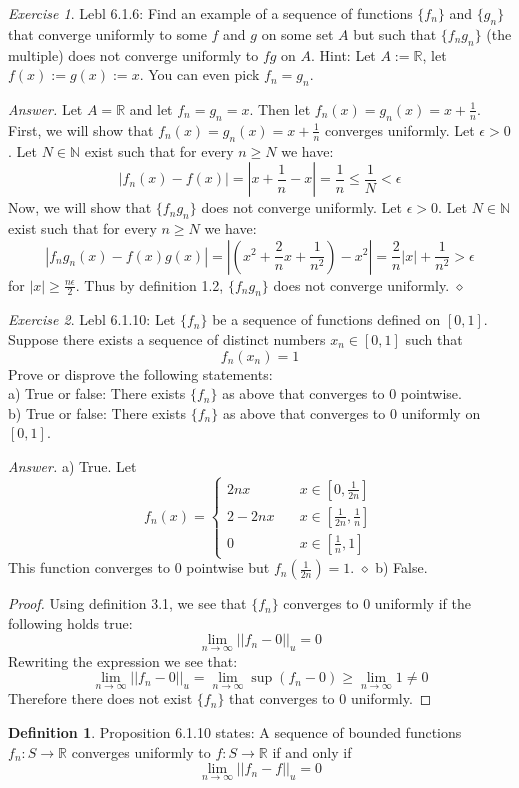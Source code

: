 \documentclass[12pt,oneside]{amsart}
\theoremstyle{definition}
\newtheorem{definition}[equation]{Definition}
\theoremstyle{remark}
\newtheorem{exer}{Exercise}
\numberwithin{equation}{exer}
\newenvironment{answer}{\bigskip\noindent\emph{Answer.}}{\hfill$\diamond$\newline}
\begin{document}
\begin{exer}
Lebl 6.1.6: Find an example of a sequence of functions $\{f_n\}$ and $\{g_n\}$ that converge uniformly to some $f$ and $g$ on some set $A$ but such that $\{f_ng_n\}$ (the multiple) does not converge uniformly to $fg$ on $A$. Hint: Let $A:=\mathbb{R}$, let $f(x):=g(x):=x$. You can even pick $f_n=g_n$.
\end{exer}
\begin{answer}
Let $A=\mathbb{R}$ and let $f_n=g_n=x$. Then let $f_n(x)=g_n(x)=x+\frac{1}{n}$. \\
First, we will show that $f_n(x)=g_n(x)=x+\frac{1}{n}$ converges uniformly. Let $\epsilon>0$. Let $N\in\mathbb{N}$ exist such that for every $n\geq N$ we have:
$$|f_n(x)-f(x)|=|x+\frac{1}{n}-x|=\frac{1}{n}\leq\frac{1}{N}<\epsilon$$
Now, we will show that $\{f_ng_n\}$ does not converge uniformly. Let $\epsilon>0$. Let $N\in\mathbb{N}$ exist such that for every $n\geq N$ we have:
$$|f_ng_n(x)-f(x)g(x)|=|(x^2+\frac{2}{n}x+\frac{1}{n^2})-x^2|=\frac{2}{n}|x|+\frac{1}{n^2}>\epsilon$$
for $|x|\geq\frac{n\epsilon}{2}$. Thus by definition 1.2, $\{f_ng_n\}$ does not converge uniformly.
\end{answer}

\newpage

\begin{exer}
Lebl 6.1.10: Let $\{f_n\}$ be a sequence of functions defined on $[0,1]$. Suppose there exists a sequence of distinct numbers $x_n\in[0,1]$ such that 
$$f_n(x_n)=1$$
Prove or disprove the following statements: \\
a) True or false: There exists $\{f_n\}$ as above that converges to 0 pointwise. \\
b) True or false: There exists $\{f_n\}$ as above that converges to 0 uniformly on $[0,1]$.
\end{exer}
\begin{answer}
a) True. Let
\begin{equation*}
f_n(x) = \left\{
        \begin{array}{ll}
            2nx & \quad x\in[0,\frac{1}{2n}] \\
            2-2nx & \quad x\in[\frac{1}{2n},\frac{1}{n}] \\
            0 & \quad x\in[\frac{1}{n},1]
        \end{array}
    \right.
\end{equation*}
This function converges to 0 pointwise but $f_n(\frac{1}{2n})=1$.
\end{answer}
b) False.
\begin{proof}
Using definition 3.1, we see that $\{f_n\}$ converges to $0$ uniformly if the following holds true:
$$\lim_{n\to\infty}||f_n-0||_u=0$$
Rewriting the expression we see that:
$$\lim_{n\to\infty}||f_n-0||_u=\lim_{n\to\infty}\sup(f_n-0)\geq\lim_{n\to\infty}1\neq0$$
Therefore there does not exist $\{f_n\}$ that converges to $0$ uniformly.
\end{proof}
\begin{definition}
Proposition 6.1.10 states: A sequence of bounded functions $f_n:S\rightarrow\mathbb{R}$ converges uniformly to $f:S\rightarrow\mathbb{R}$ if and only if 
$$\lim_{n\to\infty}||f_n-f||_u=0$$
\end{definition}
\end{document}
